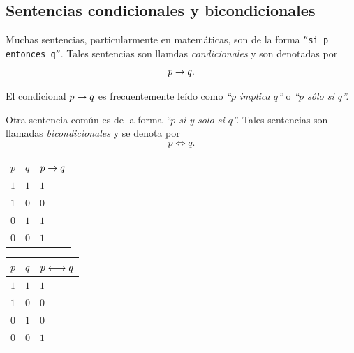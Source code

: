 \subsection{Sentencias condicionales y bicondicionales}


 Muchas sentencias, particularmente en matem\'aticas, son de la forma \texttt{``si $p$ entonces $q$''}.  Tales sentencias son llamdas \emph{condicionales} y son denotadas por 
 $$
 p \rightarrow q.
 $$ 



 El condicional $p \rightarrow q$ es frecuentemente le\'ido como \emph{``$p$ implica $q$''} o \emph{``$p$ s\'olo si $q$''.}



 Otra sentencia com\'un es de la forma \emph{``$p$ si y solo si $q$''.}  Tales sentencias son llamadas \emph{bicondicionales} y se denota por 
 $$
 p \iff q.
 $$



 \begin{tdv}[Condicional]
\begin{center}
 \begin{tabular}{|l|l||l|} \hline
$p$ & $q$ & $p \rightarrow q$ \\ \hline
$1$ & $1$ & $1$ \\ \hline
$1$ & $0$ & $0$ \\ \hline
$0$ & $1$ & $1$ \\ \hline
$0$ & $0$ & $1$ \\ \hline
\end{tabular}
\end{center}

 \end{tdv}




 \begin{tdv}[Bicondicional]
\begin{center}
\begin{tabular}{|l|l||l|} \hline
$p$ & $q$ & $p \longleftrightarrow q$ \\ \hline
$1$ & $1$ & $1$ \\ \hline
$1$ & $0$ & $0$ \\ \hline
$0$ & $1$ & $0$ \\ \hline
$0$ & $0$ & $1$ \\ \hline
\end{tabular}
\end{center}

 \end{tdv}




